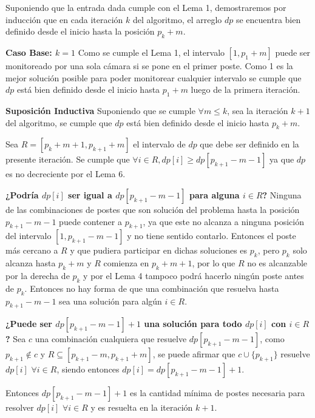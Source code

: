 \documentclass{article}
\begin{document}
Suponiendo que la entrada dada cumple con el Lema 1, demostraremos por inducción que en cada iteración \( k \) del algoritmo, el arreglo \( dp \) se encuentra bien definido desde el inicio hasta la posición \( p_k + m \).

\textbf{Caso Base: \( k = 1 \)}
Como se cumple el Lema 1, el intervalo \([1, p_1 + m]\) puede ser monitoreado por una sola cámara si se pone en el primer poste. Como 1 es la mejor solución posible para poder monitorear cualquier intervalo se cumple que \( dp \) está bien definido desde el inicio hasta \( p_1 + m \) luego de la primera iteración.

\textbf{Suposición Inductiva}
Suponiendo que se cumple \( \forall m \leq k \), sea la iteración \( k + 1 \) del algoritmo, se cumple que \( dp \) está bien definido desde el inicio hasta \( p_k + m \).

Sea \( R = [p_k + m + 1, p_{k+1} + m] \) el intervalo de \( dp \) que debe ser definido en la presente iteración. Se cumple que \( \forall i \in R, dp[i] \geq dp[p_{k+1} - m - 1] \) ya que \( dp \) es no decreciente por el Lema 6.

\textbf{¿Podría \( dp[i] \) ser igual a \( dp[p_{k+1} - m - 1] \) para alguna \( i \in R \)?}
Ninguna de las combinaciones de postes que son solución del problema hasta la posición \( p_{k+1} - m - 1 \) puede contener a \( p_{k+1} \), ya que este no alcanza a ninguna posición del intervalo \([1, p_{k+1} - m - 1]\) y no tiene sentido contarlo. Entonces el poste más cercano a \( R \) y que pudiera participar en dichas soluciones es \( p_k \), pero \( p_k \) solo alcanza hasta \( p_k + m \) y \( R \) comienza en \( p_k + m + 1 \), por lo que \( R \) no es alcanzable por la derecha de \( p_k \) y por el Lema 4 tampoco podrá hacerlo ningún poste antes de \( p_k \). Entonces no hay forma de que una combinación que resuelva hasta \( p_{k+1} - m - 1 \) sea una solución para algún \( i \in R \).

\textbf{¿Puede ser \( dp[p_{k+1} - m - 1] + 1 \) una solución para todo \( dp[i] \) con \( i \in R \)?}
Sea \( c \) una combinación cualquiera que resuelve \( dp[p_{k+1} - m - 1] \), como \( p_{k+1} \notin c \) y \( R \subseteq [p_{k+1} - m, p_{k+1} + m] \), se puede afirmar que \( c \cup \{p_{k+1}\} \) resuelve \( dp[i] \) \( \forall i \in R \), siendo entonces \( dp[i] = dp[p_{k+1} - m - 1] + 1 \).

Entonces \( dp[p_{k+1} - m - 1] + 1 \) es la cantidad mínima de postes necesaria para resolver \( dp[i] \) \( \forall i \in R \) y es resuelta en la iteración \( k + 1 \).
\end{document}
